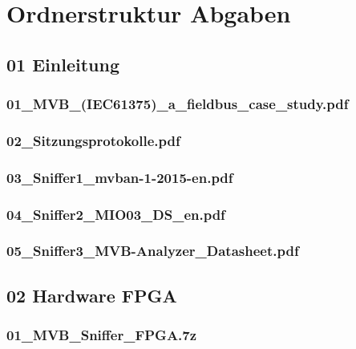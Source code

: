 


\chapter{Ordnerstruktur Abgaben} %
\label{ApendixB} %

\titlespacing*{\subsection}{1cm}{0.5em}{0.5em}

\section{01 Einleitung}
\label{app:Odner1}
\subsection{01\_MVB\_(IEC61375)\_a\_fieldbus\_case\_study.pdf}
\label{app:File11}
\subsection{02\_Sitzungsprotokolle.pdf}
\label{app:File12}
\subsection{03\_Sniffer1\_mvban-1-2015-en.pdf}
\label{app:File13}
\subsection{04\_Sniffer2\_MIO03\_DS\_en.pdf}
\label{app:File14}
\subsection{05\_Sniffer3\_MVB-Analyzer\_Datasheet.pdf}
\label{app:File15}

\section{02 Hardware FPGA}
\label{app:Odner3}
\subsection{01\_MVB\_Sniffer\_FPGA.7z}
\label{app:File31}

